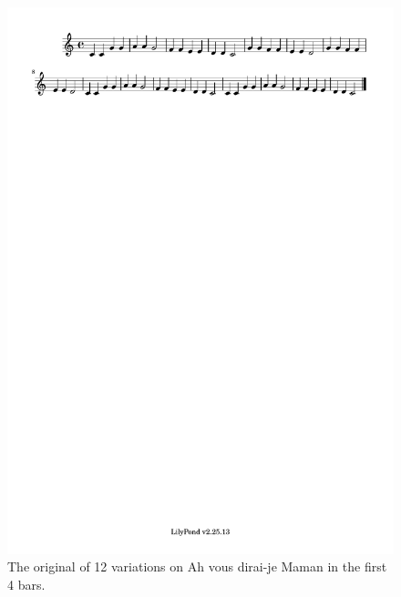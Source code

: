 \documentclass[11pt]{article}
\theoremstyle{definition}
\begin{document}
\begin{figure}
\centering
\includegraphics[trim=1cm 26.5cm 8.07cm 0.02cm, clip, scale=1]{dabby_1.pdf} %
\caption{The original of 12 variations on Ah vous dirai-je Maman in the first 4 bars.}
\label{fig:DabbyER1} 
\end{figure}
\end{document}
